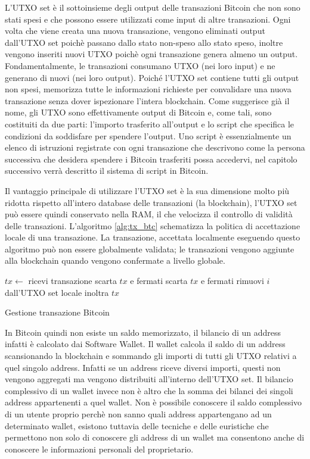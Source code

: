 L'UTXO set è il sottoinsieme degli output delle transazioni Bitcoin che non sono stati spesi e che possono essere utilizzati come input di altre transazioni. Ogni volta che viene creata una nuova transazione, vengono eliminati output dall'UTXO set poichè passano dallo stato non-speso allo stato speso, inoltre vengono inseriti nuovi UTXO poichè ogni transazione genera almeno un output. Fondamentalmente, le transazioni consumano UTXO (nei loro input) e ne generano di nuovi (nei loro output). Poiché l'UTXO set contiene tutti gli output non spesi, memorizza tutte le informazioni richieste per convalidare una nuova transazione senza dover ispezionare l'intera blockchain. Come suggerisce già il nome, gli UTXO sono effettivamente output di Bitcoin e, come tali, sono costituiti da due parti: l'importo trasferito all'output e lo script che specifica le condizioni da soddisfare per spendere l'output. Uno script è essenzialmente un elenco di istruzioni registrate con ogni transazione che descrivono come la persona successiva che desidera spendere i Bitcoin trasferiti possa accedervi, nel capitolo successivo verrà descritto il sistema di script in Bitcoin.

Il vantaggio principale di utilizzare l'UTXO set è la sua dimensione molto più ridotta rispetto all'intero database delle transazioni (la blockchain), l'UTXO set può essere quindi conservato nella RAM, il che velocizza il controllo di validità delle transazioni. L'algoritmo \ref{alg:tx_btc} schematizza la politica di accettazione locale di una transazione. La transazione, accettata localmente eseguendo questo algoritmo può non essere globalmente validata; le transazioni vengono aggiunte alla blockchain quando vengono confermate a livello globale.
\begin{algorithm}
\begin{algorithmic}
\State $tx \gets$ ricevi transazione
        \State scarta $tx$ e fermati
    \EndIf
\EndFor
{}
    \State scarta $tx$ e fermati
\EndIf
{}
    \State rimuovi $i$ dall'UTXO set locale
\EndFor
\State inoltra $tx$
\end{algorithmic}
\caption{Gestione transazione Bitcoin}
\label{alg:tx_btc}
\end{algorithm}
\FloatBarrier
In Bitcoin quindi non esiste un saldo memorizzato, il bilancio di un address infatti è calcolato dai Software Wallet. Il wallet calcola il saldo di un address scansionando la blockchain e sommando gli importi di tutti gli UTXO relativi a quel singolo address. Infatti se un address riceve diversi importi, questi non vengono aggregati ma vengono distribuiti all'interno dell'UTXO set. Il bilancio complessivo di un wallet invece non è altro che la somma dei bilanci dei singoli address appartenenti a quel wallet. 
Non è possibile conoscere il saldo complessivo di un utente proprio perchè non sanno quali address appartengano ad un determinato wallet, esistono tuttavia delle tecniche e delle euristiche che permettono non solo di conoscere gli address di un wallet ma consentono anche di conoscere le informazioni personali del proprietario.
